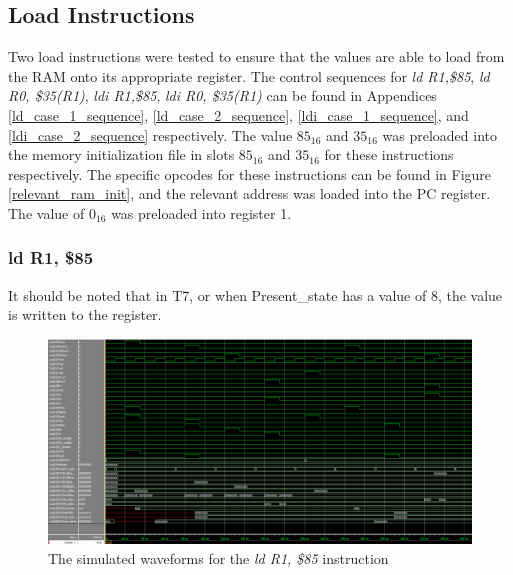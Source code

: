 \documentclass{article}
\begin{document}
    \subsection{Load Instructions}
        Two load instructions were tested to ensure that the values are able to load from the RAM onto its appropriate register. The control sequences for \emph{ld R1,\$85}, \emph{ld R0, \$35(R1)}, \emph{ldi R1,\$85}, \emph{ldi R0, \$35(R1)} can be found in Appendices \ref{ld_case_1_sequence}, \ref{ld_case_2_sequence}, \ref{ldi_case_1_sequence}, and \ref{ldi_case_2_sequence} respectively. The value $85_{16}$ and $35_{16}$ was preloaded into the memory initialization file in slots $85_{16}$ and $35_{16}$ for these instructions respectively. The specific opcodes for these instructions can be found in Figure \ref{relevant_ram_init}, and the relevant address was loaded into the PC register. The value of $0_{16}$ was preloaded into register 1.
       
        \subsubsection{ld R1, \$85}
            It should be noted that in T7, or when Present\_state has a value of 8, the value is written to the register.
            \begin{figure}[h!]
                \begin{center}
                    \includegraphics[width=15cm]{ld_case_1_wave.png}
                    \caption{The simulated waveforms for the \emph{ld R1, \$85} instruction}
                \end{center}
            \end{figure}
\end{document}
